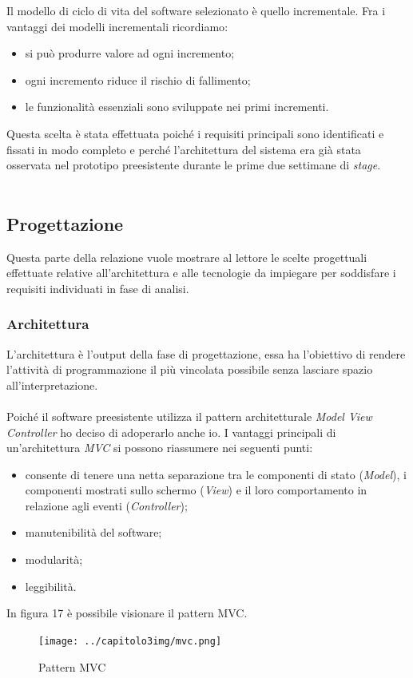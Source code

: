 Il modello di ciclo di vita del software selezionato è quello incrementale. Fra i vantaggi dei modelli incrementali ricordiamo\cite{7}:
\begin{itemize}
\item si può produrre valore ad ogni incremento;
\item ogni incremento riduce il rischio di fallimento;
\item le funzionalità essenziali sono sviluppate nei primi incrementi.
\end{itemize}
Questa scelta è stata effettuata poiché i requisiti principali sono identificati e fissati in modo completo e perché l'architettura del sistema era già stata osservata nel prototipo preesistente durante le prime due settimane di \emph{stage}.\\\\
\subsection{Progettazione}
\label{3.3}
Questa parte della relazione vuole mostrare al lettore le scelte progettuali effettuate relative all'architettura e alle tecnologie da impiegare per soddisfare i requisiti individuati in fase di analisi.
\subsubsection{Architettura}
\label{3.3.1}
L'architettura è l'output della fase di progettazione, essa ha l'obiettivo di rendere l'attività di programmazione il più vincolata possibile senza lasciare spazio all'interpretazione.\\\\
Poiché il software preesistente utilizza il pattern architetturale \emph{Model View Controller} ho deciso di adoperarlo anche io. I vantaggi principali di un'architettura \emph{MVC} si possono riassumere nei seguenti punti:
\begin{itemize}
\item consente di tenere una netta separazione tra le componenti di stato (\emph{Model}), i componenti mostrati sullo schermo (\emph{View}) e
il loro comportamento in relazione agli eventi (\emph{Controller});
\item manutenibilità del software;
\item modularità;
\item leggibilità.
\end{itemize}
In figura 17 è possibile visionare il pattern MVC.
\begin{figure}[H]
\centering
\texttt{[image: ../capitolo3img/mvc.png]}
\caption{Pattern MVC}
\end{figure}
